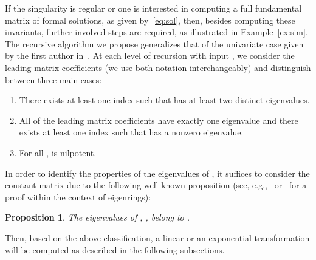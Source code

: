 \documentclass[final,1p,times,number,amsthm]{elsart}
\newtheorem{proposition}[lemma]{Proposition}
\begin{document}
If the singularity is regular or one is interested in computing a full
fundamental matrix of formal solutions, as given by~\eqref{eq:sol}, then, besides
computing these invariants, further involved steps are required, as illustrated
in Example~\ref{ex:sim}. The recursive algorithm we propose generalizes that of
the univariate case given by the first author in~\cite{key24}. At each level of
recursion with input , we consider the leading matrix coefficients
 (we use both notation interchangeably) and distinguish
between three main cases:

\begin{enumerate}
\item There exists at least one index  such that
   has at least two distinct eigenvalues.
\item All of the leading matrix coefficients have exactly one eigenvalue and
  there exists at least one index  such that
   has a nonzero eigenvalue.
\item For all ,  is nilpotent.
\end{enumerate}
\vspace{0.3cm}

In order to identify the properties of the eigenvalues of , it
suffices to consider the constant matrix  due to the following
well-known proposition (see, e.g.,~\cite[Proposition 1, pp 8]{key4}
or~\cite[Proposition 2.2]{key9} for a proof within the context of eigenrings):
\begin{proposition}
\label{constev}
The eigenvalues of  , , belong to .
\end{proposition}
Then, based on the above classification, a linear or an exponential
transformation will be computed as described in the following subsections.
\end{document}
